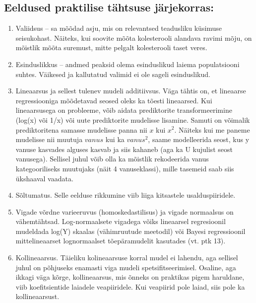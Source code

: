 \documentclass[]{book}
\begin{document}
\hypertarget{eeldused-praktilise-tahtsuse-jarjekorras}{%
\subsection*{Eeldused praktilise tähtsuse järjekorras:}\label{eeldused-praktilise-tahtsuse-jarjekorras}}

\begin{enumerate}
\def\labelenumi{\arabic{enumi}.}
\item
  Valiidsus -- sa mõõdad asju, mis on relevantsed teadusliku küsimuse seisukohast. Näiteks, kui soovite mõõta kolesterooli alandava ravimi mõju, on mõistlik mõõta suremust, mitte pelgalt kolesterooli taset veres.
\item
  Esinduslikkus -- andmed peaksid olema esinduslikud laiema populatsiooni suhtes. Väikesed ja kallutatud valimid ei ole sageli esinduslikud.
\item
  Lineaarsus ja sellest tulenev mudeli additiivsus. Väga tähtis on, et lineaarse regressiooniga mõõdetavad seosed oleks ka tõesti lineaarsed. Kui lineaarsusega on probleeme, võib aidata prediktorite transformeerimine (log(x) või 1/x) või uute prediktorite mudelisse lisamine. Samuti on võimalik prediktoritena samasse mudelisse panna nii \(x\) kui \(x^2\). Näiteks kui me paneme mudelisse nii muutuja \(vanus\) kui ka \(vanus^2\), saame modelleerida seost, kus y vanuse kasvades alguses kasvab ja siis kahaneb (aga ka U kujulist seost vanusega). Sellisel juhul võib olla ka mõistlik rekodeerida vanus kategooriliseks muutujaks (näit 4 vanuseklassi), mille tasemeid saab siis ükshaaval vaadata.
\item
  Sõltumatus. Selle eelduse rikkumine viib liiga kitsastele usalduspiiridele.
\item
  Vigade võrdne varieeruvus (homoskedastilisus) ja vigade normaalsus on vähemtähtsad. Log-normaalsete vigadega võiks lineaarsel regresioonil mudeldada log(Y) skaalas (vähimruutude meetodil) või Bayesi regressioonil mittelineaarset lognormaalset tõepäramudelit kasutades (vt. ptk 13).
\item
  Kollineaarsus. Täieliku kolineaarsuse korral mudel ei lahendu, aga sellisel juhul on põhjuseks enamasti viga mudeli spetsifitseerimisel. Osaline, aga ikkagi väga kõrge, kollineaarsus, mis õnneks on praktikas pigem haruldane, viib koefitsientide laiadele veapiiridele. Kui veapiirid pole laiad, siis pole ka kollineaarsust.
\end{enumerate}
\end{document}
